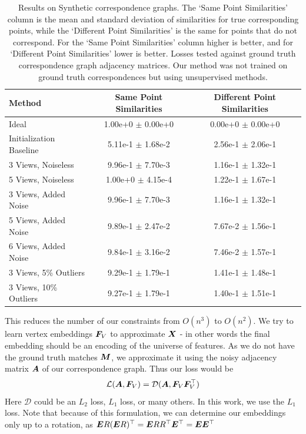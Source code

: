 \documentclass{article} %
\begin{document}
\begin{table}[t]
\begin{center}
\begin{tabular}{|l|c|c|}
\hline
Method & Same Point Similarities & Different Point Similarities  \\
\hline\hline\hline
Ideal                              & 1.00e+0 $\pm$ 0.00e+0 & 0.00e+0 $\pm$ 0.00e+0 \\ \hline
Initialization Baseline            & 5.11e-1 $\pm$ 1.68e-2 & 2.56e-1 $\pm$ 2.06e-1 \\ \hline
3 Views, Noiseless                 & 9.96e-1 $\pm$ 7.70e-3 & 1.16e-1 $\pm$ 1.32e-1 \\ 
5 Views, Noiseless                 & 1.00e+0 $\pm$ 4.15e-4 & 1.22e-1 $\pm$ 1.67e-1 \\ \hline
3 Views, Added Noise               & 9.96e-1 $\pm$ 7.70e-3 & 1.16e-1 $\pm$ 1.32e-1 \\ 
5 Views, Added Noise               & 9.89e-1 $\pm$ 2.47e-2 & 7.67e-2 $\pm$ 1.56e-1 \\ 
6 Views, Added Noise               & 9.84e-1 $\pm$ 3.16e-2 & 7.46e-2 $\pm$ 1.57e-1 \\ \hline
3 Views, 5\% Outliers              & 9.29e-1 $\pm$ 1.79e-1 & 1.41e-1 $\pm$ 1.48e-1 \\ 
3 Views, 10\% Outliers             & 9.27e-1 $\pm$ 1.79e-1 & 1.40e-1 $\pm$ 1.51e-1 \\ \hline

\hline
\end{tabular}
\end{center}
\caption{
Results on Synthetic correspondence graphs.
The `Same Point Similarities' column is the mean and standard deviation of similarities for true corresponding points, while the `Different Point Similarities' is the same for points that do not correspond.
For the `Same Point Similarities' column higher is better, and for `Different Point Similarities' lower is better.
Losses tested against ground truth correspondence graph adjacency matrices.
Our method was not trained on ground truth correspondences but using unsupervised methods.
}
\label{fig:synthtable}
\end{table}

This reduces the number of our constraints from $O(n^3)$ to $O(n^2)$.
We try to learn vertex embeddings ${\bm{F}}_V$ to approximate ${\bm{X}}$ - in other words the final embedding should be an encoding of the universe of features.
As we do not have the ground truth matches ${\bm{M}}$, we approximate it using the noisy adjacency matrix ${\bm{A}}$ of our correspondence graph. Thus our loss would be 
\begin{equation}
\mathcal{L}({\bm{A}}, {\bm{F}}_V) = \mathcal{D}({\bm{A}}, {\bm{F}}_V {\bm{F}}_V^\top)
\end{equation}
Here $\mathcal{D}$ could be an $L_2$ loss, $L_1$ loss, or many others. In this work, we use the $L_1$ loss. 
Note that because of this formulation, we can determine our embeddings only up to a rotation, as
$ {\bm{E}} R({\bm{E}} R)^\top
= {\bm{E}} RR^\top {\bm{E}}^\top
= {\bm{E}}{\bm{E}}^\top
\label{eq:rotinvar} $
\end{document}
